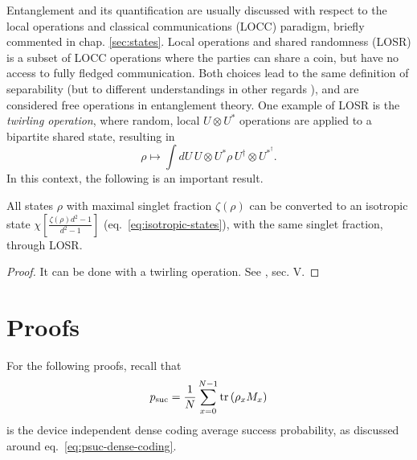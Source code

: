     Entanglement and its quantification are usually discussed with respect to the local operations and classical communications (LOCC) paradigm, briefly commented in chap. \ref{sec:states}. Local operations and shared randomness (LOSR) is a subset of LOCC operations where the parties can share a coin, but have no access to fully fledged communication. Both choices lead to the same definition of separability (but to different understandings in other regards \cite{schmid_arxiv2004.09194}), and are considered free operations in entanglement theory. One example of LOSR is the \emph{twirling operation}, where random, local $U \otimes U^*$ operations are applied to a bipartite shared state, resulting in
    $$
        \rho \longmapsto \int dU\, U \otimes U^* \rho\, U^\dagger \otimes U^{*^\dagger} .
    $$
    In this context, the following is an important result. 

    \begin{lemma}
        All states $\rho$ with maximal singlet fraction $\zeta(\rho)$ can be converted to an isotropic state $\chi\left[ \frac{\zeta(\rho) d^2 - 1}{d^2 - 1} \right]$ (eq.~\eqref{eq:isotropic-states}), with the same singlet fraction, through LOSR.
        \label{lem:twirling}
    \end{lemma}
    \begin{proof}
        It can be done with a twirling operation. See \cite{horodecki_1999_isotropic}, sec. V.
    \end{proof}


\section{Proofs}

    For the following proofs, recall that
    \begin{equation*}
        p_{\text{suc}} = \frac{1}{N} \sum_{x=0}^{N-1} \text{tr}\left( \rho_x M_x \right)
    \end{equation*}
    is the device independent dense coding average success probability, as discussed around eq.~\eqref{eq:psuc-dense-coding}. 


